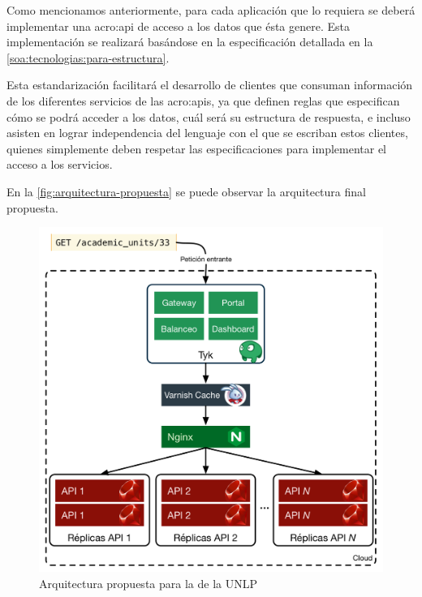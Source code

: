 Como mencionamos anteriormente, para cada aplicación que lo requiera se deberá implementar una \gls{acro:api} de acceso a los datos que ésta genere. Esta implementación se realizará basándose en la especificación  detallada en la \autoref{soa:tecnologias:para-estructura}.

Esta estandarización facilitará el desarrollo de clientes que consuman información de los diferentes servicios de las \glspl{acro:api}, ya que definen reglas que especifican cómo se podrá acceder a los datos, cuál será su estructura de respuesta, e incluso asisten en lograr independencia del lenguaje con el que se escriban estos clientes, quienes simplemente deben respetar las especificaciones para implementar el acceso a los servicios.

En la \autoref{fig:arquitectura-propuesta} se puede observar la arquitectura final propuesta.

\begin{figure}[H]
  \includegraphics[width=\linewidth]{src/images/04-capitulo-4/propuesta-arquitectura-final.png}
  \caption{Arquitectura propuesta para la {\cloud} de la UNLP}
  \label{fig:arquitectura-propuesta}
\end{figure}
